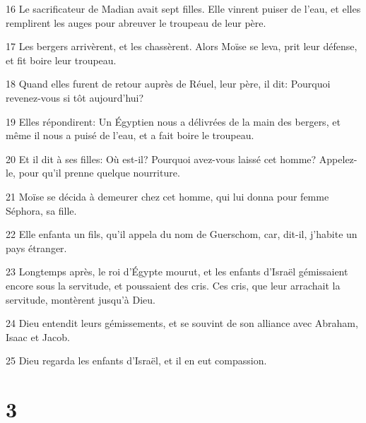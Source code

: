 \par 16 Le sacrificateur de Madian avait sept filles. Elle vinrent puiser de l'eau, et elles remplirent les auges pour abreuver le troupeau de leur père.
\par 17 Les bergers arrivèrent, et les chassèrent. Alors Moïse se leva, prit leur défense, et fit boire leur troupeau.
\par 18 Quand elles furent de retour auprès de Réuel, leur père, il dit: Pourquoi revenez-vous si tôt aujourd'hui?
\par 19 Elles répondirent: Un Égyptien nous a délivrées de la main des bergers, et même il nous a puisé de l'eau, et a fait boire le troupeau.
\par 20 Et il dit à ses filles: Où est-il? Pourquoi avez-vous laissé cet homme? Appelez-le, pour qu'il prenne quelque nourriture.
\par 21 Moïse se décida à demeurer chez cet homme, qui lui donna pour femme Séphora, sa fille.
\par 22 Elle enfanta un fils, qu'il appela du nom de Guerschom, car, dit-il, j'habite un pays étranger.
\par 23 Longtemps après, le roi d'Égypte mourut, et les enfants d'Israël gémissaient encore sous la servitude, et poussaient des cris. Ces cris, que leur arrachait la servitude, montèrent jusqu'à Dieu.
\par 24 Dieu entendit leurs gémissements, et se souvint de son alliance avec Abraham, Isaac et Jacob.
\par 25 Dieu regarda les enfants d'Israël, et il en eut compassion.

\chapter{3}

